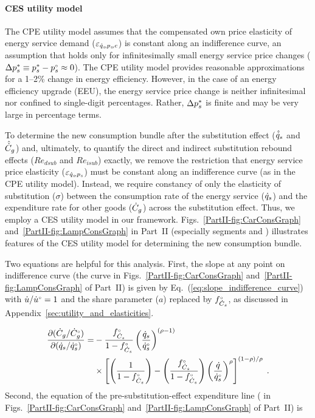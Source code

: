 \paragraph{CES utility model}
\label{sec:Resub_exact_method}

The CPE utility model assumes that
the compensated own price elasticity of energy service demand ($\varepsilon_{\dot{q}_s\!,p_s\!,c}$)
is constant along an indifference curve, an
assumption that holds only
for infinitesimally small energy service price changes
($\Delta {p}^*_s \equiv {p}^*_s - {}{p}^{\scriptscriptstyle \circ}_s \approx 0$).
The CPE utility model provides
reasonable approximations for a 1--2\% change in energy efficiency.
However, in the case of an energy efficiency upgrade (EEU),
the energy service price change is neither infinitesimal nor confined
to single-digit percentages.
Rather,
$\Delta {p}^*_s$ is finite and may be very large in percentage terms.

To determine the new consumption bundle after the substitution effect
($\hat{\dot{q}}_s$ and $\hat{\dot{C}}_g$)
and,
ultimately, to quantify the direct and indirect substitution rebound effects
($Re_{dsub}$ and $Re_{isub}$) exactly,
we remove the restriction that energy service price elasticity
($\varepsilon_{\dot{q}_s\!,p_s}$)
must be constant along an indifference curve
(as in the CPE utility model).
Instead, we require constancy of only
the elasticity of substitution ($\sigma$) between
the consumption rate of the energy service ($\dot{q}_s$)
and the expenditure rate for other goods ($\dot{C}_g$)
across the substitution effect.
Thus, we employ a CES utility model in our framework.
Figs.~\ref{PartII-fig:CarConsGraph}
and~\ref{PartII-fig:LampConsGraph} in Part~II
(especially segments \starc{} and \chat{})
illustrates features
of the CES utility model for determining the new consumption bundle.

Two equations are helpful for this analysis.
First, the slope at any point on indifference curve
(the \iicirc{} curve in
Figs.~\ref{PartII-fig:CarConsGraph}
and~\ref{PartII-fig:LampConsGraph}
of Part~II)
is given by Eq.~(\ref{eq:slope_indifference_curve}) with
$\dot{u}/{}{\dot{u}}^{\scriptscriptstyle \circ} = 1$ and
the share parameter ($a$) replaced by ${}{f}^{\scriptscriptstyle \circ}_{\dot{C}_s}$,
as discussed in Appendix~\ref{sec:utility_and_elasticities}.

\begin{align} \label{eq:slope_indifference_curve_u1}
  \frac{\partial (\dot{C}_g/{}{\dot{C}}^{\scriptscriptstyle \circ}_g)}{\partial (\dot{q}_s/{}{\dot{q}}^{\scriptscriptstyle \circ}_s)} =&
        -\frac{{}{f}^{\scriptscriptstyle \circ}_{\dot{C}_s}}{1 - {}{f}^{\scriptscriptstyle \circ}_{\dot{C}_s}} \left( \frac{\dot{q}_s}{{}{\dot{q}}^{\scriptscriptstyle \circ}_s} \right)^{(\rho -1)} \nonumber  \\
        &\times \left[ \left( \frac{1}{1 - {}{f}^{\scriptscriptstyle \circ}_{\dot{C}_s}} \right)
                - \left( \frac{{}{f}^{\scriptscriptstyle \circ}_{\dot{C}_s}}{1 - {}{f}^{\scriptscriptstyle \circ}_{\dot{C}_s}} \right)
                          \left( \frac{\dot{q}}{{}{\dot{q}}^{\scriptscriptstyle \circ}_s} \right)^\rho \right]^{(1 - \rho)/\rho} \; .
\end{align}
%
Second, the equation of the pre-substitution-effect expenditure line
(\starstar{} in
Figs.~\ref{PartII-fig:CarConsGraph}
and~\ref{PartII-fig:LampConsGraph}
of Part~II) is


